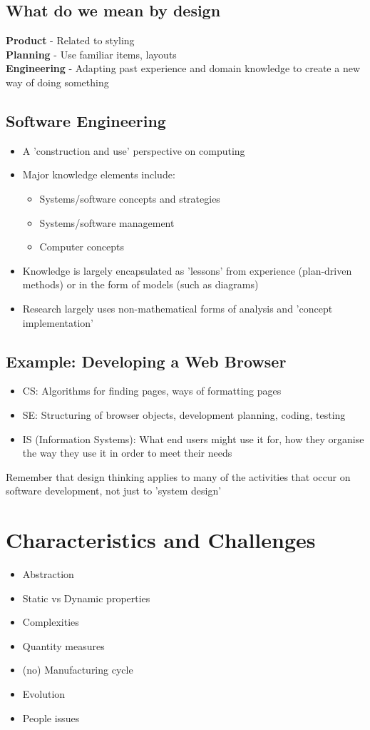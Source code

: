 \documentclass{article}[18pt]
\begin{document}
\subsection{What do we mean by design}
\textbf{Product} - Related to styling\\
\textbf{Planning} - Use familiar items, layouts\\
\textbf{Engineering} - Adapting past experience and domain knowledge to create a new way of doing something
\subsection{Software Engineering}
\begin{itemize}
	\item A 'construction and use' perspective on computing
	\item Major knowledge elements include:
	\begin{itemize}
		\item Systems/software concepts and strategies
		\item Systems/software management
		\item Computer concepts
	\end{itemize}
	\item Knowledge is largely encapsulated as 'lessons' from experience (plan-driven methods) or in the form of models (such as diagrams)
	\item Research largely uses non-mathematical forms of analysis and 'concept implementation'
\end{itemize}
\subsection{Example: Developing a Web Browser}
\begin{itemize}
	\item CS: Algorithms for finding pages, ways of formatting pages
	\item SE: Structuring of browser objects, development planning, coding, testing
	\item IS (Information Systems): What end users might use it for, how they organise the way they use it in order to meet their needs
\end{itemize}
Remember that design thinking applies to many of the activities that occur on software development, not just to 'system design'
\section{Characteristics and Challenges}
\begin{itemize}
	\item Abstraction
	\item Static vs Dynamic properties
	\item Complexities
	\item Quantity measures
	\item (no) Manufacturing cycle
	\item Evolution
	\item People issues
\end{itemize}
\end{document}
